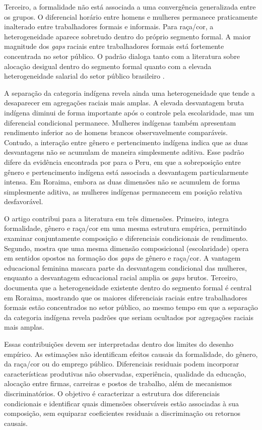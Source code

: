\documentclass[12pt]{article}
\begin{document}
Terceiro, a formalidade não está associada a uma convergência generalizada entre os grupos. 
O diferencial horário entre homens e mulheres permanece praticamente inalterado entre 
trabalhadores formais e informais. Para raça/cor, a heterogeneidade aparece sobretudo dentro 
do próprio segmento formal. A maior magnitude dos \textit{gaps} raciais entre trabalhadores formais 
está fortemente concentrada no setor público. O padrão dialoga tanto com a literatura sobre 
alocação desigual dentro do segmento formal quanto com a elevada heterogeneidade salarial 
do setor público brasileiro \citep{gerard2021, baez2021}.

A separação da categoria indígena revela ainda uma heterogeneidade que tende a desaparecer 
em agregações raciais mais amplas. A elevada desvantagem bruta indígena diminui de forma 
importante após o controle pela escolaridade, mas um diferencial condicional permanece. 
Mulheres indígenas também apresentam rendimento inferior ao de homens brancos observavelmente 
comparáveis. Contudo, a interação entre gênero e pertencimento indígena indica que as duas 
desvantagens não se acumulam de maneira simplesmente aditiva. Esse padrão difere da 
evidência encontrada por \citet{kolev2015} para o Peru, em que a sobreposição entre gênero 
e pertencimento indígena está associada a desvantagem particularmente intensa. Em Roraima, 
embora as duas dimensões não se acumulem de forma simplesmente aditiva, as mulheres indígenas 
permanecem em posição relativa desfavorável.

O artigo contribui para a literatura em três dimensões. Primeiro, integra formalidade, 
gênero e raça/cor em uma mesma estrutura empírica, permitindo examinar conjuntamente 
composição e diferenciais condicionais de rendimento. Segundo, mostra que uma mesma 
dimensão composicional (escolaridade) opera em sentidos opostos na formação dos \textit{gaps} 
de gênero e raça/cor. A vantagem educacional feminina mascara parte da desvantagem 
condicional das mulheres, enquanto a desvantagem educacional racial amplia os \textit{gaps} brutos. 
Terceiro, documenta que a heterogeneidade existente dentro do segmento formal é central 
em Roraima, mostrando que os maiores diferenciais raciais entre trabalhadores formais estão 
concentrados no setor público, ao mesmo tempo em que a separação da categoria indígena 
revela padrões que seriam ocultados por agregações raciais mais amplas.

Essas contribuições devem ser interpretadas dentro dos limites do desenho empírico. 
As estimações não identificam efeitos causais da formalidade, do gênero, da raça/cor 
ou do emprego público. Diferenciais residuais podem incorporar características produtivas 
não observadas, experiência, qualidade da educação, alocação entre firmas, carreiras e 
postos de trabalho, além de mecanismos discriminatórios. O objetivo é caracterizar a 
estrutura dos diferenciais condicionais e identificar quais dimensões observáveis estão 
associadas à sua composição, sem equiparar coeficientes residuais a discriminação ou 
retornos causais.
\end{document}
